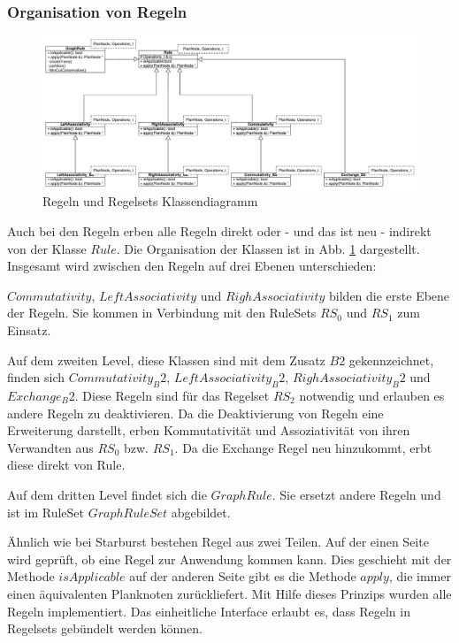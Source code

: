 \subsubsection{Organisation von Regeln}


\begin{figure}[h]
  \centering
  \includegraphics[width=\textwidth]{04_Implementierung/Rules.pdf}
  \caption{Regeln und Regelsets Klassendiagramm}
  \label{RuleClassDiagram}
\end{figure}


Auch bei den Regeln erben alle Regeln direkt oder - und das ist neu - indirekt von der Klasse $Rule$. Die Organisation der Klassen ist in Abb. \ref{RuleClassDiagram} dargestellt. Insgesamt wird zwischen den Regeln auf drei Ebenen unterschieden: 

$Commutativity$, $LeftAssociativity$ und $RighAssociativity$ bilden die erste Ebene der Regeln. Sie kommen in Verbindung mit den RuleSets $RS_0$ und $RS_1$ zum Einsatz.

Auf dem zweiten Level, diese Klassen sind mit dem Zusatz $B2$ gekennzeichnet, finden sich $Commutativity_B2$, $LeftAssociativity_B2$, $RighAssociativity_B2$ und $Exchange_B2$. Diese Regeln sind für das Regelset $RS_2$ notwendig und erlauben es andere Regeln zu deaktivieren. Da die Deaktivierung von Regeln eine Erweiterung darstellt, erben Kommutativität und Assoziativität von ihren Verwandten aus $RS_0$ bzw. $RS_1$. Da die Exchange Regel neu hinzukommt, erbt diese direkt von Rule.

Auf dem dritten Level findet sich die $GraphRule$. Sie ersetzt andere Regeln und ist im RuleSet $GraphRuleSet$ abgebildet.


Ähnlich wie bei Starburst bestehen Regel aus zwei Teilen. Auf der einen Seite wird geprüft, ob eine Regel zur Anwendung kommen kann. Dies geschieht mit der Methode $isApplicable$ auf der anderen Seite gibt es die Methode $apply$, die immer einen äquivalenten Planknoten zurückliefert. Mit Hilfe dieses Prinzips wurden alle Regeln implementiert. Das einheitliche Interface erlaubt es, dass Regeln in Regelsets gebündelt werden können.


